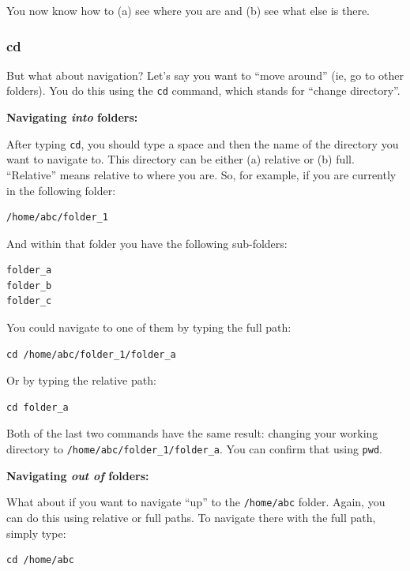 \documentclass[]{book}
\begin{document}
You now know how to (a) see where you are and (b) see what else is there.

\hypertarget{cd}{%
\subsubsection*{cd}\label{cd}}

But what about navigation? Let's say you want to ``move around'' (ie, go to other folders). You do this using the \texttt{cd} command, which stands for ``change directory''.

\textbf{Navigating \emph{into} folders:}

After typing \texttt{cd}, you should type a space and then the name of the directory you want to navigate to. This directory can be either (a) relative or (b) full. ``Relative'' means relative to where you are. So, for example, if you are currently in the following folder:

\begin{verbatim}
/home/abc/folder_1
\end{verbatim}

And within that folder you have the following sub-folders:

\begin{verbatim}
folder_a
folder_b
folder_c
\end{verbatim}

You could navigate to one of them by typing the full path:

\begin{verbatim}
cd /home/abc/folder_1/folder_a
\end{verbatim}

Or by typing the relative path:

\begin{verbatim}
cd folder_a
\end{verbatim}

Both of the last two commands have the same result: changing your working directory to \texttt{/home/abc/folder\_1/folder\_a}. You can confirm that using \texttt{pwd}.

\textbf{Navigating \emph{out of} folders:}

What about if you want to navigate ``up'' to the \texttt{/home/abc} folder. Again, you can do this using relative or full paths. To navigate there with the full path, simply type:

\begin{verbatim}
cd /home/abc
\end{verbatim}
\end{document}
